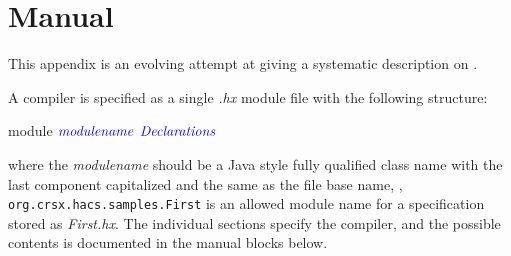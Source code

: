 \documentclass[11pt]{article} %
\begin{document}

\clearpage
\appendix\small

\section{Manual}\label{app:manual}

This appendix is an evolving attempt at giving a systematic description on \HAX.

\begin{manual}\label{man:structure}
  A \HAX compiler is specified as a single \emph{.hx} module file with the following structure:
  \begin{hacs}[mathescape,xleftmargin=\parindent]
module $\text{\it\color{blue}modulename}$
{
  $\text{\it\color{blue}Declarations}$
}
  \end{hacs}
  where the \emph{modulename} should be a Java style fully qualified class name with the last
  component capitalized and the same as the file base name, \eg, \verb|org.crsx.hacs.samples.First|
  is an allowed module name for a specification stored as \emph{First.hx}. The individual sections
  specify the compiler, and the possible contents is documented in the manual blocks below.
\end{manual}
\end{document}
